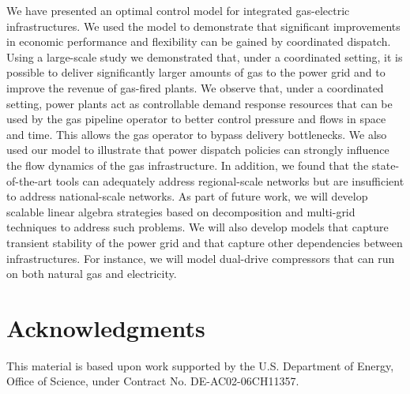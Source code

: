 \documentclass[11pt,twoside]{article}
\begin{document}
We have presented an optimal control model for integrated gas-electric infrastructures. We used the model to demonstrate that significant improvements in economic performance and flexibility can be gained by coordinated dispatch.  Using a large-scale study we demonstrated that, under a coordinated setting, it is possible to deliver significantly larger amounts of  gas to the power grid and to improve the revenue of gas-fired plants. We observe that, under a coordinated setting, power plants act as controllable demand response resources that can be used by the gas pipeline operator to better control pressure and flows in space and time. This allows the gas operator to bypass delivery bottlenecks. We also used our model to illustrate that power dispatch policies can strongly influence the flow dynamics of the gas infrastructure.  In addition, we found that the state-of-the-art tools can adequately address regional-scale networks but are insufficient to address national-scale networks.  As part of future work, we will develop scalable linear algebra strategies based on decomposition and multi-grid techniques to address such problems.  We will also develop models that capture transient stability of the power grid and that capture other dependencies between infrastructures. For instance, we will model dual-drive compressors that can run on both natural gas and electricity.  


\section*{Acknowledgments}
This material is based upon work supported by the U.S. Department of Energy, Office of Science, under Contract
No. DE-AC02-06CH11357.



\end{document}
